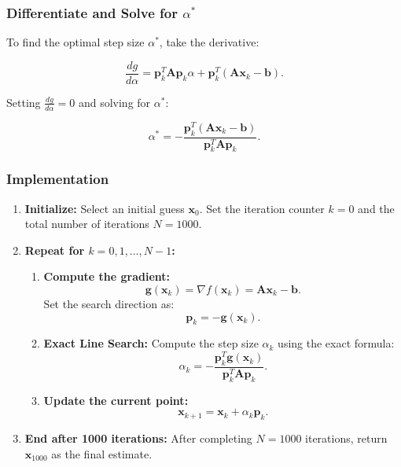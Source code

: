 \documentclass[12pt]{article}
\begin{document}
\subsubsection{Differentiate and Solve for \( \alpha^* \)}

To find the optimal step size \( \alpha^* \), take the derivative:

\[
\frac{d g}{d \alpha} = \mathbf{p}_k^T \mathbf{A} \mathbf{p}_k \alpha + \mathbf{p}_k^T (\mathbf{A} \mathbf{x}_k - \mathbf{b}).
\]

Setting \( \frac{d g}{d \alpha} = 0 \) and solving for \( \alpha^* \):

\[
\alpha^* = -\frac{\mathbf{p}_k^T (\mathbf{A} \mathbf{x}_k - \mathbf{b})}{\mathbf{p}_k^T \mathbf{A} \mathbf{p}_k}.
\]

\subsubsection{Implementation}
\begin{enumerate}
    \item \textbf{Initialize:}  
    Select an initial guess \( \mathbf{x}_0 \).  
    Set the iteration counter \( k = 0 \) and the total number of iterations \( N = 1000 \).
    
    \item \textbf{Repeat for \( k = 0, 1, \dots, N-1 \):}
    
    \begin{enumerate}
        \item \textbf{Compute the gradient:}  
        \[
        \mathbf{g}(\mathbf{x}_k) = \nabla f(\mathbf{x}_k) = \mathbf{A} \mathbf{x}_k - \mathbf{b}.
        \]
        Set the search direction as:
        \[
        \mathbf{p}_k = -\mathbf{g}(\mathbf{x}_k).
        \]
        
        \item \textbf{Exact Line Search:}  
        Compute the step size \( \alpha_k \) using the exact formula:
        \[
        \alpha_k = -\frac{\mathbf{p}_k^T \mathbf{g}(\mathbf{x}_k)}{\mathbf{p}_k^T \mathbf{A} \mathbf{p}_k}.
        \]
        
        \item \textbf{Update the current point:}  
        \[
        \mathbf{x}_{k+1} = \mathbf{x}_k + \alpha_k \mathbf{p}_k.
        \]
        
    \end{enumerate}
    
    \item \textbf{End after 1000 iterations:}  
    After completing \( N = 1000 \) iterations, return \( \mathbf{x}_{1000} \) as the final estimate.
    
\end{enumerate}
\end{document}

